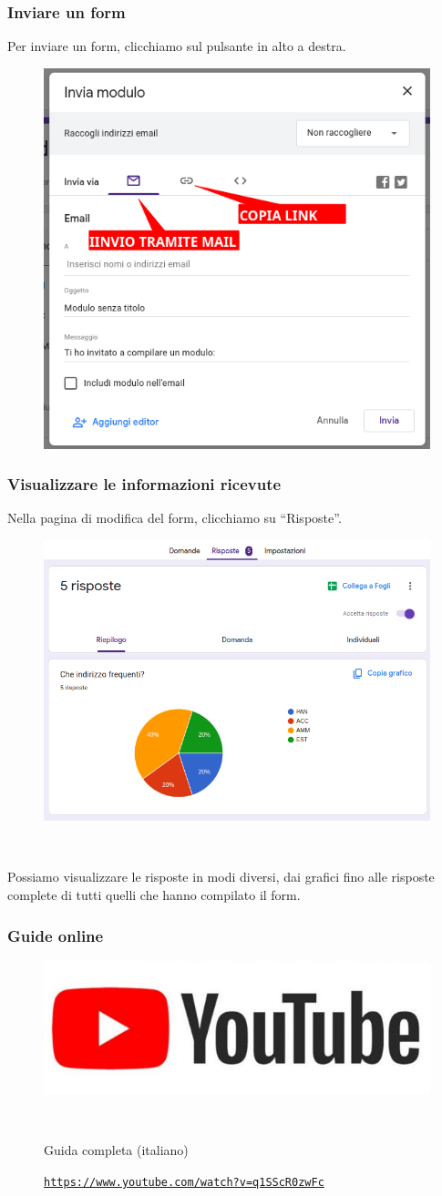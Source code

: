 \documentclass[]{beamer}
\begin{document}
\begin{frame}
\frametitle{Inviare un form}
Per inviare un form, clicchiamo sul pulsante in alto a destra.
\begin{figure}
  \includegraphics[width=.5\columnwidth]{img/form5.png}
\end{figure}
\end{frame}






\begin{frame}
\frametitle{Visualizzare le informazioni ricevute}
Nella pagina di modifica del form, clicchiamo su ``Risposte''.

\begin{figure}
  \includegraphics[width=.6\columnwidth]{img/form6.png}
\end{figure}\pause

~

Possiamo visualizzare le risposte in modi diversi, dai grafici fino alle risposte complete di tutti quelli che hanno compilato il form.
\end{frame}




\begin{frame}
\frametitle{Guide online}
\begin{figure}
\includegraphics[width=.5\columnwidth]{img/ytlogo.jpg}

~

Guida completa (italiano)

\href{https://www.youtube.com/watch?v=q1SScR0zwFc}{\texttt{https://www.youtube.com/watch?v=q1SScR0zwFc}}
\end{figure}
\end{frame}
\end{document}
